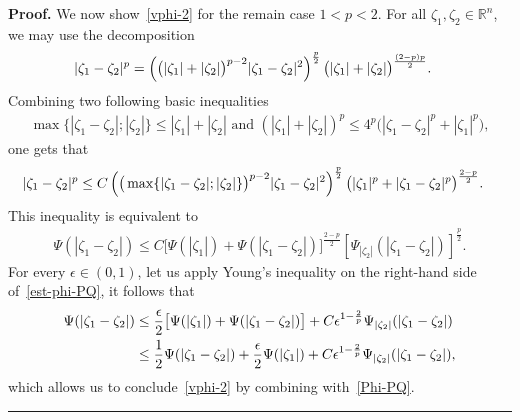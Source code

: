 \documentclass[a4paper, 11pt]{article}
\newenvironment{proof}[1][Proof]{\textbf{#1.} }{\hfill\rule{0.5em}{0.5em}}
\begin{document}
\begin{proof}
We now show~\eqref{vphi-2} for the remain case $1<p<2$. For all $\zeta_1, \zeta_2 \in \mathbb{R}^n$, we may use the decomposition
\begin{align}\notag
|\zeta_1-\zeta_2|^p & = \left(\big(|\zeta_1|+|\zeta_2|\big)^{p-2} |\zeta_1-\zeta_2|^2\right)^{\frac{p}{2}}  \big(|\zeta_1|+|\zeta_2|\big)^{\frac{(2-p)p}{2}} .
\end{align}
Combining two following basic inequalities 
\begin{align*}
\max\{|\zeta_1-\zeta_2|; |\zeta_2|\} \le |\zeta_1| + |\zeta_2| \mbox{ and } (|\zeta_1|+|\zeta_2|)^p \le 4^p\big(|\zeta_1-\zeta_2|^p + |\zeta_1|^p\big),
\end{align*}
one gets that
\begin{align}\notag
|\zeta_1-\zeta_2|^p & \le C \left(\big(\max\{|\zeta_1-\zeta_2|; |\zeta_2|\}\big)^{p-2} |\zeta_1-\zeta_2|^2\right)^{\frac{p}{2}} \big(|\zeta_1|^p+|\zeta_1-\zeta_2|^p\big)^{\frac{2-p}{2}}.
\end{align}
This inequality is equivalent to
\begin{align}\label{est-phi-PQ}
\Psi(|\zeta_1-\zeta_2|) \le C \big[\Psi(|\zeta_1|) + \Psi(|\zeta_1-\zeta_2|)\big]^{\frac{2-p}{2}} \left[\Psi_{|\zeta_2|}(|\zeta_1-\zeta_2|)\right]^{\frac{p}{2}}.
\end{align}
For every $\epsilon \in (0,1)$, let us apply Young's inequality on the right-hand side of~\eqref{est-phi-PQ}, it follows that
\begin{align}\notag
\Psi(|\zeta_1-\zeta_2|) &\le \frac{\epsilon}{2} \big[\Psi(|\zeta_1|) + \Psi(|\zeta_1-\zeta_2|)\big] + C \epsilon^{1-\frac{2}{p}} \Psi_{|\zeta_2|}(|\zeta_1-\zeta_2|) \\
&\le \frac{1}{2} \Psi(|\zeta_1-\zeta_2|) + \frac{\epsilon}{2} \Psi(|\zeta_1|) + C \epsilon^{1-\frac{2}{p}} \Psi_{|\zeta_2|}(|\zeta_1-\zeta_2|),\notag
\end{align}
which allows us to conclude~\eqref{vphi-2} by combining with~\eqref{Phi-PQ}.
\end{proof}
\end{document}
